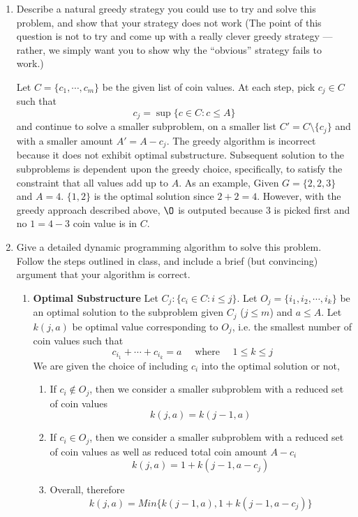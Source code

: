 \documentclass[11pt]{article}
\begin{document}
\begin{enumerate}
  \item Describe a natural greedy strategy you could use to try and solve this problem, and show that your strategy does not work (The point of this question is not to try and come up with a really clever greedy strategy — rather, we simply want you to show why the “obvious” strategy fails to work.)

  \begin{solution}
    Let $C = \{ c_1, \cdots, c_m \}$ be the given list of coin values. At each step, pick $c_{j} \in C$ such that
    \[
      c_{j} = \sup\{ c\in C: c\leq A \}
    \]
    and continue to solve a smaller subproblem, on a smaller list $C' = C \setminus \{ c_{j} \}$ and with a smaller amount $A' = A - c_{j}$. The greedy algorithm is incorrect because it does not exhibit optimal substructure. Subsequent solution to the subproblems is dependent upon the greedy choice, specifically, to satisfy the constraint that all values add up to $A$. As an example, Given $G = \{ 2, 2, 3 \}$ and $A = 4$. $\{ 1, 2\}$ is the optimal solution since $2+2=4$. However, with the greedy approach described above, $\O$ is outputed because $3$ is picked first and no $1 = 4-3$ coin value is in $C$.
  \end{solution}

  \item Give a detailed dynamic programming algorithm to solve this problem. Follow the steps outlined in class, and include a brief (but convincing) argument that your algorithm is correct.


  \begin{enumerate}
    \item \textbf{Optimal Substructure} Let $C_j: \{ c_{i}\in C: i \leq j \}$. Let $O_j =\{ i_1, i_2, \cdots, i_k\}$ be an optimal solution to the subproblem given $C_j$ ($j\leq m$) and $a
    \leq A$. Let $k(j, a)$ be optimal value corresponding to $O_j$, i.e. the smallest number of coin values such that
    \[
      c_{i_1} + \cdots + c_{i_k} = a \quad \text{ where } \quad 1\leq k \leq j
    \]
    We are given the choice of including $c_i$ into the optimal solution or not,
    \begin{enumerate}
      \item If $c_i \not\in O_j$, then we consider a smaller subproblem with a reduced set of coin values
      \[
        k(j, a) = k(j-1, a)
      \]
      \item If $c_i \in O_j$, then we consider a smaller subproblem with a reduced set of coin values as well as reduced total coin amount $A - c_i$
      \[
        k(j, a) = 1 + k(j-1, a-c_j)
      \]
      \item Overall, therefore
      \[
        k(j, a) = Min\{ k(j-1, a),1 + k(j-1, a-c_j)\}
      \]
    \end{enumerate}


\end{enumerate}
\end{enumerate}
\end{document}
